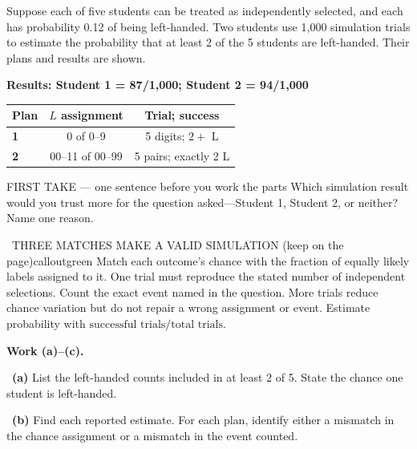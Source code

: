 \documentclass[11pt]{article}
\begin{document}


Suppose each of five students can be treated as independently selected, and each has probability 0.12 of being left-handed. Two students use 1,000 simulation trials to estimate the probability that at least 2 of the 5 students are left-handed. Their plans and results are shown.\par
\begin{center}
\textbf{Results: Student 1 = 87/1,000; Student 2 = 94/1,000}\par\smallskip
\begin{tabular}{|l|c|c|}
\hline
\textbf{Plan} & \textbf{$L$ assignment} & \textbf{Trial; success} \\ \hline
\textbf{1} & 0 of 0--9 & 5 digits; $2+$ L \\ \hline
\textbf{2} & 00--11 of 00--99 & 5 pairs; exactly 2 L \\ \hline
\end{tabular}
\end{center}
\begin{firsttakebox}{FIRST TAKE --- one sentence before you work the parts}
Which simulation result would you trust more for the question asked---Student 1, Student 2, or neither? Name one reason.
\workspace{0.9in}
\end{firsttakebox}

\begin{callout}{\IconBook\ THREE MATCHES MAKE A VALID SIMULATION (keep on the page)}{calloutgreen}
Match each outcome's chance with the fraction of equally likely labels assigned to it. One trial must reproduce the stated number of independent selections. Count the exact event named in the question. More trials reduce chance variation but do not repair a wrong assignment or event. Estimate probability with $\text{successful trials}/\text{total trials}$.
\end{callout}

\newpage
\textbf{Work (a)--(c).}\par\smallskip

~\textbf{(a)} List the left-handed counts included in at least 2 of 5. State the chance one student is left-handed.\par
\workspace{0.8in}

~\textbf{(b)} Find each reported estimate. For each plan, identify either a mismatch in the chance assignment or a mismatch in the event counted.\par
\workspace{1.4in}
\end{document}
